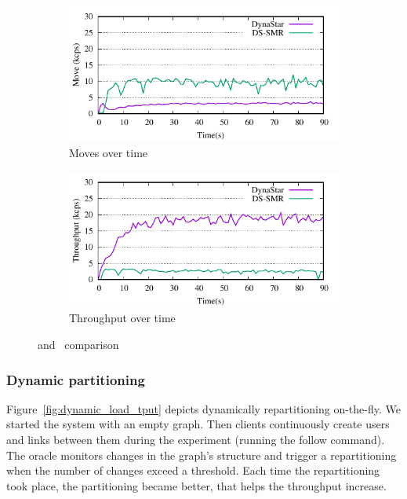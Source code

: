 \begin{figure}
\captionsetup{justification=centering}
\centering
	\begin{subfigure}[ht]{0.5\textwidth}
		\includegraphics{figures/experiments/move-dynastar-vs-dssmr-4p}
		\caption{Moves over time}
		\label{fig:4p_moves}
	\end{subfigure}

\begin{subfigure}[ht]{0.5\textwidth}
	\includegraphics{figures/experiments/tp-dynastar-vs-dssmr-4p}
	\caption{Throughput over time}
	\label{fig:4p_tput}
\end{subfigure}
\caption{\dynastar and \dssmr\ comparison}
\label{fig:move_throughput_dssmr_vs_dynastar}
\end{figure}

\subsubsection{Dynamic partitioning}
Figure~\ref{fig:dynamic_load_tput} depicts dynamically repartitioning on-the-fly.
We started the system with an empty graph. Then clients continuously create users and links between them
during the experiment (running the follow command).  The oracle monitors changes in the graph's structure and 
trigger a repartitioning when the number of changes exceed a threshold.
Each time the repartitioning took place, the partitioning became better, that helps the throughput increase. 

